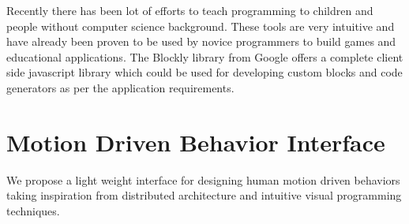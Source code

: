 \documentclass{llncs}
\begin{document}
	Recently there has been lot of efforts to teach programming to children and people without computer science background\cite{Scratch}\cite{Blockly}. These tools are very intuitive and have already been proven to be used by novice programmers to build games and educational applications. The Blockly library\cite{Blockly} from Google offers a complete client side javascript library which could be used for developing custom blocks and code generators as per the application requirements.
\section{Motion Driven Behavior Interface}
%
We propose a light weight interface for designing human motion driven behaviors taking inspiration from distributed architecture\cite{quigley2009ros} and intuitive visual programming techniques\cite{Blockly}. 
%
\end{document}
